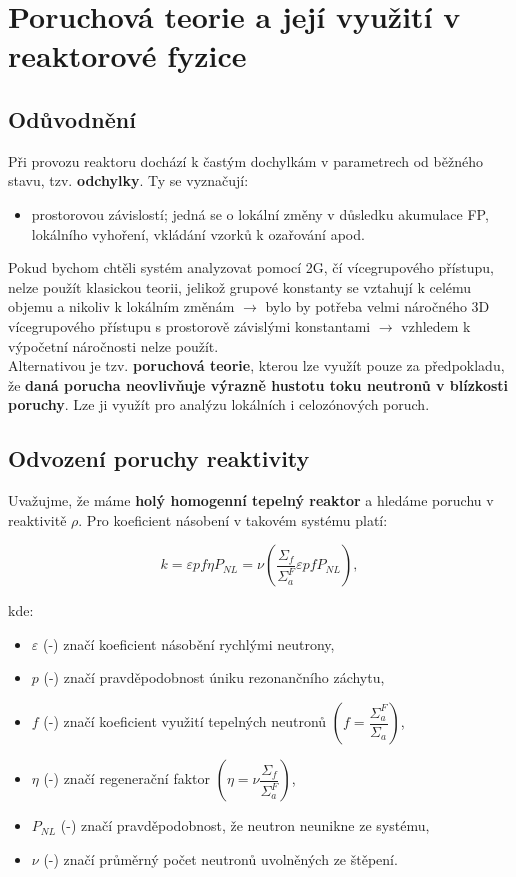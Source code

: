 \section{Poruchová teorie a její využití v reaktorové fyzice}

\subsection{Odůvodnění}

Při provozu reaktoru dochází k častým dochylkám v parametrech od běžného stavu, tzv. \textbf{odchylky}. Ty se vyznačují:

\begin{itemize}
  \item prostorovou závislostí; jedná se o lokální změny v důsledku akumulace FP, lokálního vyhoření, vkládání vzorků k ozařování apod.
\end{itemize}

Pokud bychom chtěli systém analyzovat pomocí 2G, čí vícegrupového přístupu, nelze použít klasickou teorii, jelikož grupové konstanty se vztahují k celému objemu a nikoliv k lokálním změnám $\rightarrow$ bylo by potřeba velmi náročného 3D vícegrupového přístupu s prostorově závislými konstantami $\rightarrow$ vzhledem k výpočetní náročnosti nelze použít.\\

Alternativou je tzv. \textbf{poruchová teorie}, kterou lze využít pouze za předpokladu, že \textbf{daná porucha neovlivňuje výrazně hustotu toku neutronů v blízkosti poruchy}. Lze ji využít pro analýzu lokálních i celozónových poruch.

\subsection{Odvození poruchy reaktivity}

Uvažujme, že máme \textbf{holý homogenní tepelný reaktor} a hledáme poruchu v reaktivitě $\rho$. Pro koeficient násobení v takovém systému platí:

$$ k = \varepsilon p f \eta P_{NL} = \nu \left ( \dfrac{\Sigma_f}{\Sigma_a^F} \varepsilon p f P_{NL} \right ), $$

kde:

\begin{itemize}
  \item $\varepsilon$ (-) značí koeficient násobění rychlými neutrony,
  \item $p$ (-) značí pravděpodobnost úniku rezonančního záchytu,
  \item $f$ (-) značí koeficient využití tepelných neutronů $\left ( f = \dfrac{\Sigma_a^F}{\Sigma_a} \right )$,
  \item $\eta$ (-) značí regenerační faktor $\left ( \eta = \nu \dfrac{\Sigma_f}{\Sigma_a^F} \right )$,
  \item $P_{NL}$ (-) značí pravděpodobnost, že neutron neunikne ze systému,
  \item $\nu$ (-) značí průměrný počet neutronů uvolněných ze štěpení.
\end{itemize}

